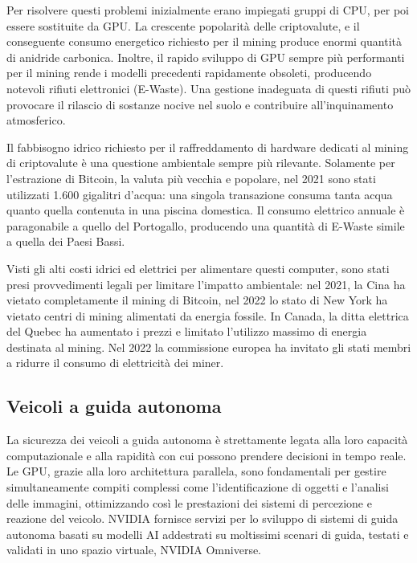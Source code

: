 \documentclass[12pt,a4paper,oneside]{book}
\begin{document}
Per risolvere questi problemi inizialmente erano impiegati gruppi di CPU, per poi essere sostituite da GPU. La crescente popolarità delle criptovalute, e il conseguente consumo energetico richiesto per il mining produce enormi quantità di anidride carbonica. Inoltre, il rapido sviluppo di GPU sempre più performanti per il mining rende i modelli precedenti rapidamente obsoleti, producendo notevoli rifiuti elettronici (E-Waste). Una gestione inadeguata di questi rifiuti può provocare il rilascio di sostanze nocive nel suolo e contribuire all'inquinamento atmosferico.

Il fabbisogno idrico richiesto per il raffreddamento di hardware dedicati al mining di criptovalute è una questione ambientale sempre più rilevante. Solamente per l'estrazione di Bitcoin, la valuta più vecchia e popolare, nel 2021 sono stati utilizzati 1.600 gigalitri d'acqua: una singola transazione consuma tanta acqua quanto quella contenuta in una piscina domestica. Il consumo elettrico annuale è paragonabile a quello del Portogallo, producendo una quantità di E-Waste simile a quella dei Paesi Bassi.

Visti gli alti costi idrici ed elettrici per alimentare questi computer, sono stati presi provvedimenti legali per limitare l'impatto ambientale: nel 2021, la Cina ha vietato completamente il mining di Bitcoin, nel 2022 lo stato di New York ha vietato centri di mining alimentati da energia fossile. In Canada, la ditta elettrica del Quebec ha aumentato i prezzi e limitato l'utilizzo massimo di energia destinata al mining. Nel 2022 la commissione europea ha invitato gli stati membri a ridurre il consumo di elettricità dei miner.

\subsection{Veicoli a guida autonoma}

La sicurezza dei veicoli a guida autonoma è strettamente legata alla loro capacità computazionale e alla rapidità con cui possono prendere decisioni in tempo reale. Le GPU, grazie alla loro architettura parallela, sono fondamentali per gestire simultaneamente compiti complessi come l'identificazione di oggetti e l'analisi delle immagini, ottimizzando così le prestazioni dei sistemi di percezione e reazione del veicolo. NVIDIA fornisce servizi per lo sviluppo di sistemi di guida autonoma basati su modelli AI addestrati su moltissimi scenari di guida, testati e validati in uno spazio virtuale, NVIDIA Omniverse.
\end{document}
